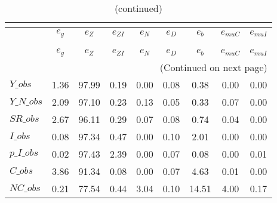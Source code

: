  
\begin{center}
\begin{longtable}{lcccccccc} 
\caption{VARIANCE DECOMPOSITION (in percent)}\\
 \label{Table:th_var_decomp_uncond}\\
\toprule 
$               $	 & 	 $        {e_g}$	 & 	 $        {e_Z}$	 & 	 $     {e_{ZI}}$	 & 	 $        {e_N}$	 & 	 $        {e_D}$	 & 	 $        {e_b}$	 & 	 $    {e_{muC}}$	 & 	 $    {e_{muI}}$\\
\midrule \endfirsthead 
\caption{(continued)}\\
 \toprule \\ 
$               $	 & 	 $        {e_g}$	 & 	 $        {e_Z}$	 & 	 $     {e_{ZI}}$	 & 	 $        {e_N}$	 & 	 $        {e_D}$	 & 	 $        {e_b}$	 & 	 $    {e_{muC}}$	 & 	 $    {e_{muI}}$\\
\midrule \endhead 
\midrule \multicolumn{9}{r}{(Continued on next page)} \\ \bottomrule \endfoot 
\bottomrule \endlastfoot 
$Y\_obs         $	 & 	         1.36	 & 	        97.99	 & 	         0.19	 & 	         0.00	 & 	         0.08	 & 	         0.38	 & 	         0.00	 & 	         0.00 \\ 
$Y\_N\_obs      $	 & 	         2.09	 & 	        97.10	 & 	         0.23	 & 	         0.13	 & 	         0.05	 & 	         0.33	 & 	         0.07	 & 	         0.00 \\ 
$SR\_obs        $	 & 	         2.67	 & 	        96.11	 & 	         0.29	 & 	         0.07	 & 	         0.08	 & 	         0.74	 & 	         0.04	 & 	         0.00 \\ 
$I\_obs         $	 & 	         0.08	 & 	        97.34	 & 	         0.47	 & 	         0.00	 & 	         0.10	 & 	         2.01	 & 	         0.00	 & 	         0.00 \\ 
$p\_I\_obs      $	 & 	         0.02	 & 	        97.43	 & 	         2.39	 & 	         0.00	 & 	         0.07	 & 	         0.08	 & 	         0.00	 & 	         0.01 \\ 
$C\_obs         $	 & 	         3.86	 & 	        91.34	 & 	         0.08	 & 	         0.00	 & 	         0.07	 & 	         4.63	 & 	         0.01	 & 	         0.00 \\ 
$NC\_obs        $	 & 	         0.21	 & 	        77.54	 & 	         0.44	 & 	         3.04	 & 	         0.10	 & 	        14.51	 & 	         4.00	 & 	         0.17 \\ 

\end{longtable}
\end{center}
